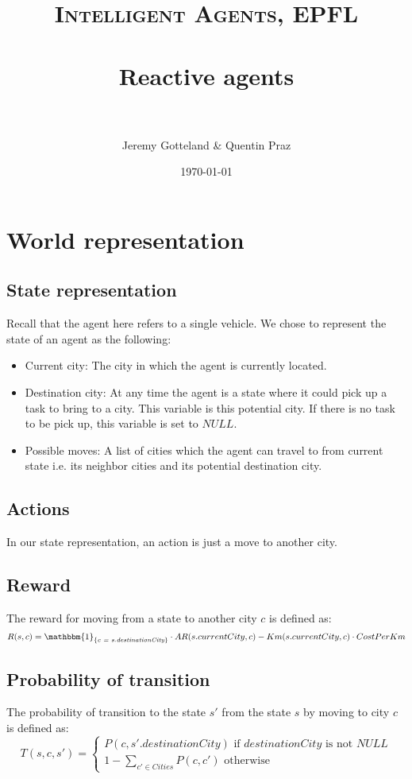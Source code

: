\documentclass[fontsize=11pt]{scrartcl} %
\title{	
\normalfont \normalsize 
\textsc{Intelligent Agents, EPFL} \\ [20pt] %
\horrule{0.5pt} \\[0.4cm] %
\huge Reactive agents \\ %
\horrule{2pt} \\[0.5cm] %
}
\author{Jeremy Gotteland \& Quentin Praz} %
\date{\normalsize\today} %
\begin{document}
\maketitle %


\section*{World representation}
\subsection*{State representation}
Recall that the agent here refers to a single vehicle.
We chose to represent the state of an agent as the following:
\begin{itemize}
\item Current city: The city in which the agent is currently located.
\item Destination city: At any time the agent is a state where it could pick up a task to bring to a city. This variable is this potential city. If there is no task to be pick up, this variable is set to $NULL$.
\item Possible moves: A list of cities which the agent can travel to from current state i.e. its neighbor cities and its potential destination city.
\end{itemize}

\subsection*{Actions}
In our state representation, an action is just a move to another city.

\subsection*{Reward}
The reward for moving from a state to another city $c$ is defined as:
$$
R(s,c) = \mathbbm{1}_{ \{ \textit{c = s.destinationCity} \} } \cdot AR(s.currentCity, c) - Km(s.currentCity, c) \cdot CostPerKm
$$

\subsection*{Probability of transition}
The probability of transition to the state $s'$ from the state $s$ by moving to city $c$ is defined as:
$$
T(s,c,s') = 
\left\{
\begin{array}{l}
 P(c, s'.destinationCity) \text{ if $destinationCity$ is not $NULL$}\\
 1-\sum_{c' \in Cities} P(c,c') \text{ otherwise}
\end{array}
\right.
$$
\end{document}
